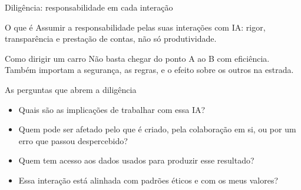 \documentclass[aspectratio=169,11pt]{beamer}
\begin{document}

\begin{frame}{Diligência: responsabilidade em cada interação}
  \begin{notebox}{O que é}
    \small Assumir a responsabilidade pelas suas interações com IA: rigor, transparência e prestação de contas, não só produtividade.
  \end{notebox}
  \vspace{0.3cm}
  \begin{alertbox}{Como dirigir um carro}
    \small Não basta chegar do ponto A ao B com eficiência. Também importam a segurança, as regras, e o efeito sobre os outros na estrada.
  \end{alertbox}
\end{frame}

\begin{frame}{As perguntas que abrem a diligência}
  \begin{itemize}
    \item Quais são as implicações de trabalhar com essa IA?
    \item Quem pode ser afetado pelo que é criado, pela colaboração em si, ou por um erro que passou despercebido?
    \item Quem tem acesso aos dados usados para produzir esse resultado?
    \item Essa interação está alinhada com padrões éticos e com os meus valores?
  \end{itemize}
\end{frame}
\end{document}
